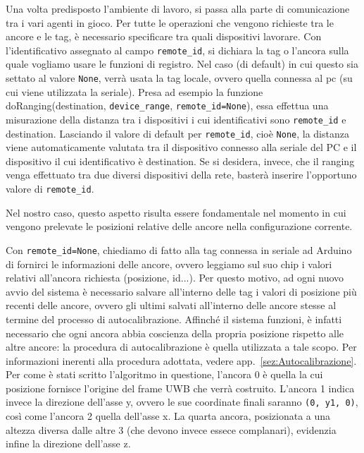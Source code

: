 Una volta predisposto l'ambiente di lavoro, si passa alla parte di comunicazione tra i vari agenti in gioco. Per tutte le operazioni che vengono richieste tra le ancore e le tag, è necessario specificare tra quali dispositivi lavorare. 
Con l'identificativo assegnato al campo \verb|remote_id|, si dichiara la tag o l'ancora sulla quale vogliamo usare le funzioni di registro. Nel caso (di default) in cui questo sia settato al valore \verb|None|, verrà usata la tag locale, ovvero quella connessa al pc (su cui viene utilizzata la seriale).
Presa ad esempio la funzione doRanging(destination, \verb|device_range|, \verb|remote_id=None|), essa effettua una misurazione della distanza tra i dispositivi i cui identificativi sono \verb|remote_id| e destination. Lasciando il valore di default per \verb|remote_id|, cioè \verb|None|, la distanza viene automaticamente valutata tra il dispositivo connesso alla seriale del PC e il dispositivo il cui identificativo è destination. 
Se si desidera, invece, che il ranging venga effettuato tra due diversi dispositivi della rete, basterà inserire l’opportuno valore di \verb|remote_id|.

Nel nostro caso, questo aspetto risulta essere fondamentale nel momento in cui vengono prelevate le posizioni relative delle ancore nella configurazione corrente. 

Con \verb|remote_id=None|, chiediamo di fatto alla tag connessa in seriale ad Arduino di fornirci le informazioni delle ancore, ovvero leggiamo sul suo chip i valori relativi all'ancora richiesta (posizione, id...).
Per questo motivo, ad ogni nuovo avvio del sistema è necessario salvare all'interno delle tag i valori di posizione più recenti delle ancore, ovvero gli ultimi salvati all'interno delle ancore stesse al termine del processo di autocalibrazione.
Affinché il sistema funzioni, è infatti necessario che ogni ancora abbia coscienza della propria posizione rispetto alle altre ancore: la procedura di autocalibrazione è quella utilizzata a tale scopo.
Per informazioni inerenti alla procedura adottata, vedere app.~\ref{sez:Autocalibrazione}. Per come è stati scritto l'algoritmo in questione, l'ancora 0 è quella la cui posizione fornisce l'origine del frame UWB che verrà costruito. 
L'ancora 1 indica invece la direzione dell'asse y, ovvero le sue coordinate finali saranno \verb|(0, y1, 0)|, così come l'ancora 2 quella dell'asse x. La quarta ancora, posizionata a una altezza diversa dalle altre 3 (che devono invece essece complanari), evidenzia infine la direzione dell'asse z.

